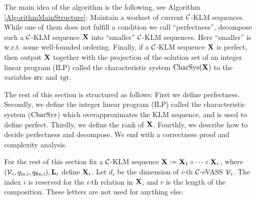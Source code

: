 
The main idea of the algorithm is the following, see Algorithm \ref{AlgorithmMainStructure}: Maintain a workset of current \(\mathcal{C}\)-KLM sequences. While one of them does not fulfill a condition we call ``perfectness'', decompose such a \(\mathcal{C}\)-KLM sequence \(\mathbf{X}\) into ``smaller'' \(\mathcal{C}\)-KLM sequences. Here ``smaller'' is w.r.t. some well-founded ordering. Finally, if a \(\mathcal{C}\)-KLM sequence \(\mathbf{X}\) is perfect, then output \(\mathbf{X}\) together with the projection of the solution set of an integer linear program (ILP) called the characteristic system \(\operatorname{CharSys}(\mathbf{X})\) to the variables \(\operatorname{src}\) and \(\operatorname{tgt}\).

The rest of this section is structured as follows: First we define perfectness. Secondly, we define the integer linear program (ILP) called the characteristic system (\(\operatorname{CharSys}\)) which overapproximates the KLM sequence, and is used to define perfect. Thirdly, we define the rank of \(\mathbf{X}\). Fourthly, we describe how to decide perfectness and decompose. We end with a correctness proof and complexity analysis.

For the rest of this section fix a \(\mathcal{C}\)-KLM sequence \(\mathbf{X}:=\mathbf{X}_1 \circ \dots \circ \mathbf{X}_r\), where \((\operatorname{\mathcal{V}}_i, q_{\text{in,i}}, q_{\text{fin,i}}), \mathbf{L}_i\) define \(\mathbf{X}_i\). Let \(d_i\) be the dimension of \(i\)-th \(\mathcal{C}\)-eVASS \(\operatorname{\mathcal{V}}_i\). The index \(i\) is reserved for the \(i\)-th relation in \(\mathbf{X}\), and \(r\) is the length of the composition. These letters are not used for anything else.

